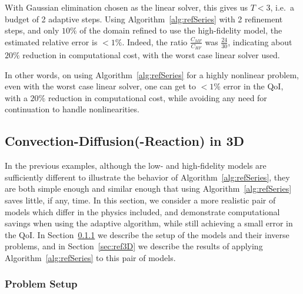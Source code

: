 {With Gaussian elimination chosen as the linear solver, this gives us $T < 3$, i.e.\ a budget of 2 adaptive steps. Using Algorithm~\ref{alg:refSeries} with 2 refinement steps, and only $10\%$ of the domain refined to use the high-fidelity model, the estimated relative error is $<1\%$. Indeed, the ratio $\frac{C_{MF}}{C_{HF}}$ was $\frac{24}{30}$, indicating about $20\%$ reduction in computational cost, with the worst case linear solver used. 

In other words, on using Algorithm~\ref{alg:refSeries} for a highly nonlinear problem, even with the worst case linear solver, one can get to $<1\%$ error in the QoI, with a $20\%$ reduction in computational cost, while avoiding any need for continuation to handle nonlinearities. }

\subsection{Convection-Diffusion(-Reaction) in 3D} \label{sec:cdvcdr3D}

In the previous examples, although the low- and high-fidelity models are sufficiently different to illustrate the behavior of Algorithm~\ref{alg:refSeries}, they are both simple enough and similar enough that using Algorithm~\ref{alg:refSeries} saves little, if any, time. In this section, we consider a more realistic pair of models which differ in the physics included, and demonstrate computational savings when using the adaptive algorithm, while still achieving a small error in the QoI. In Section~\ref{sec:setup3D} we describe the setup of the models and their inverse problems, and in Section~\ref{sec:ref3D} we describe the results of applying Algorithm~\ref{alg:refSeries} to this pair of models.

\subsubsection{Problem Setup} \label{sec:setup3D}

